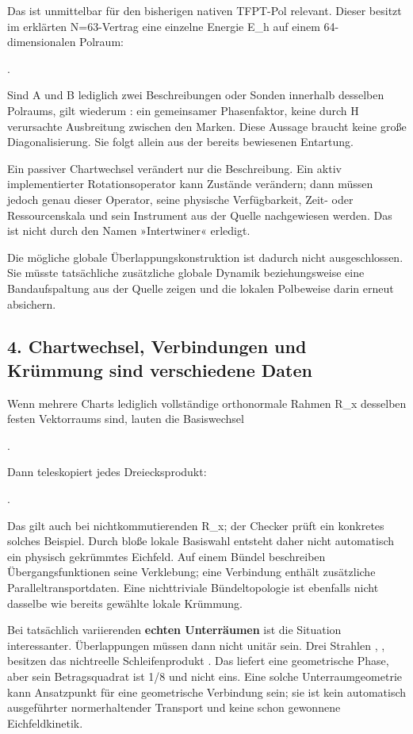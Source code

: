 Das ist unmittelbar für den bisherigen nativen TFPT-Pol relevant. Dieser
besitzt im erklärten N=63-Vertrag eine einzelne Energie E\_h auf einem
64-dimensionalen Polraum:

.

Sind A und B lediglich zwei Beschreibungen oder Sonden innerhalb
desselben Polraums, gilt wiederum : ein gemeinsamer
Phasenfaktor, keine durch H verursachte Ausbreitung zwischen den Marken.
Diese Aussage braucht keine große Diagonalisierung. Sie folgt allein aus
der bereits bewiesenen Entartung.

Ein passiver Chartwechsel verändert nur die Beschreibung. Ein aktiv
implementierter Rotationsoperator kann Zustände verändern; dann müssen
jedoch genau dieser Operator, seine physische Verfügbarkeit, Zeit- oder
Ressourcenskala und sein Instrument aus der Quelle nachgewiesen werden.
Das ist nicht durch den Namen »Intertwiner« erledigt.

Die mögliche globale Überlappungskonstruktion ist dadurch nicht
ausgeschlossen. Sie müsste tatsächliche zusätzliche globale Dynamik
beziehungsweise eine Bandaufspaltung aus der Quelle zeigen und die
lokalen Polbeweise darin erneut absichern.

\subsection{4. Chartwechsel, Verbindungen und Krümmung sind verschiedene
Daten}\label{chartwechsel-verbindungen-und-kruxfcmmung-sind-verschiedene-daten}

Wenn mehrere Charts lediglich vollständige orthonormale Rahmen R\_x
desselben festen Vektorraums sind, lauten die Basiswechsel

.

Dann teleskopiert jedes Dreiecksprodukt:

.

Das gilt auch bei nichtkommutierenden R\_x; der Checker prüft ein
konkretes solches Beispiel. Durch bloße lokale Basiswahl entsteht daher
nicht automatisch ein physisch gekrümmtes Eichfeld. Auf einem Bündel
beschreiben Übergangsfunktionen seine Verklebung; eine Verbindung
enthält zusätzliche Paralleltransportdaten. Eine nichttriviale
Bündeltopologie ist ebenfalls nicht dasselbe wie bereits gewählte lokale
Krümmung.

Bei tatsächlich variierenden \textbf{echten Unterräumen} ist die
Situation interessanter. Überlappungen  müssen dann
nicht unitär sein. Drei Strahlen , ,
 besitzen das nichtreelle Schleifenprodukt
. Das liefert eine geometrische Phase, aber sein
Betragsquadrat ist 1/8 und nicht eins. Eine solche Unterraumgeometrie
kann Ansatzpunkt für eine geometrische Verbindung sein; sie ist kein
automatisch ausgeführter normerhaltender Transport und keine schon
gewonnene Eichfeldkinetik.

